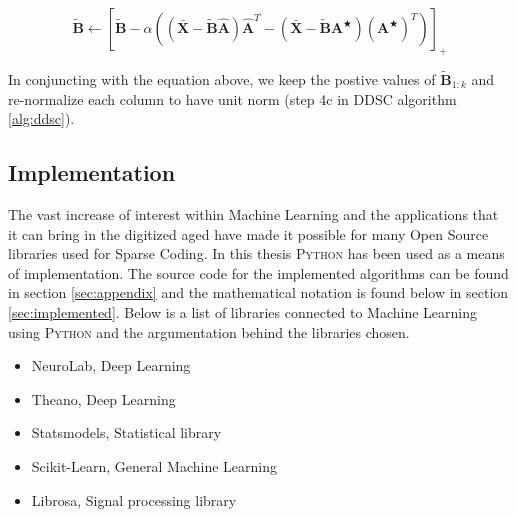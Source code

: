 \begin{equation}
\label{eq:4b}
\tilde{\mathbf{B}} \leftarrow \left[ \tilde{\mathbf{B}} - \alpha \left( (\bar{\mathbf{X}} - \tilde{\mathbf{B}}\hat{\mathbf{A}})\hat{\mathbf{A}}^T - (\bar{\mathbf{X}}-\tilde{\mathbf{B}}\mathbf{A}^\bigstar)(\mathbf{A}^\bigstar)^T \right) \right]_+
\end{equation}

In conjuncting with the equation above, we keep the postive values of $\tilde{\mathbf{B}}_{1:k}$ and re-normalize each column to have unit norm (step 4c in DDSC algorithm \ref{alg:ddsc}). 

\subsection{Implementation}
\label{sec:implementation}
The vast increase of interest within Machine Learning and the applications that it can bring in the digitized aged have made it possible for many Open Source libraries used for Sparse Coding. In this thesis \textsc{Python} has been used as a means of implementation. The source code for the implemented algorithms can be found in section \ref{sec:appendix} and the mathematical notation is found below in section \ref{sec:implemented}. Below is a list of libraries connected to Machine Learning using \textsc{Python} and the argumentation behind the libraries chosen.

\begin{itemize}
	\item{NeuroLab, Deep Learning}
	\item{Theano, Deep Learning}
	\item{Statsmodels, Statistical library}
	\item{Scikit-Learn, General Machine Learning \cite{scikit}}
	\item{Librosa, Signal processing library}
\end{itemize} 

